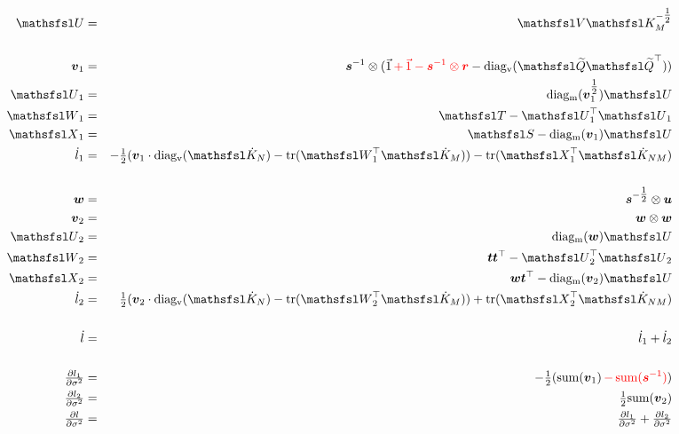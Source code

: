 \documentclass[10pt]{report}
\begin{document}
\begin{eqnarray*}
\matU & = & \mat{V} \ichol{K_M} \\
\\
\vecvx & = & \vecis \otimes (\vec{1} \red{\, + \, \vec{1} - \vecis \otimes \vecr} - \diagv{\matQn\tmatQn}) \\
\matUx & = & \diagm{\vecvx^{\onehalf}} \matU \\
\matWx & = & \matT - \matUx^\top\matUx \\
\matXx & = & \matS - \diagm{\vecvx}\matU \\
\dl_1 & = & -\onehalf(\vecvx \cdot \diagv{\dKn} - \trace{\transm{W}_1\dKm}) - \trace{\transm{X}_1\dKnm} \\
\\
\vecw & = & \veciss \otimes \vecu \\
\vecvy & = & \vecw \otimes \vecw \\
\matUy & = & \diagm{\vecw} \matU \\
\matWy & = & \vect \vect^\top - \matUy^\top\matUy \\
\matXy & = & \vecw\vect^\top - \diagm{\vecvy}\matU \\
\dl_2 & = & \onehalf(\vecvy \cdot \diagv{\dKn} - \trace{\transm{W}_2\dKm}) + \trace{\transm{X}_2\dKnm} \\
\\
\dl & = & \dl_1 + \dl_2 \\
\\
\tfrac{\partial l_1}{\partial\sigma^2} & = & -\onehalf(\mathrm{sum}(\vecvx) \red{\, - \, \mathrm{sum}(\vecis)}) \\
\tfrac{\partial l_2}{\partial\sigma^2} & = & \onehalf\mathrm{sum}(\vecvy) \\
\tfrac{\partial l}{\partial\sigma^2} & = & \tfrac{\partial l_1}{\partial\sigma^2} + \tfrac{\partial l_2}{\partial\sigma^2}
\end{eqnarray*}



\end{document}
